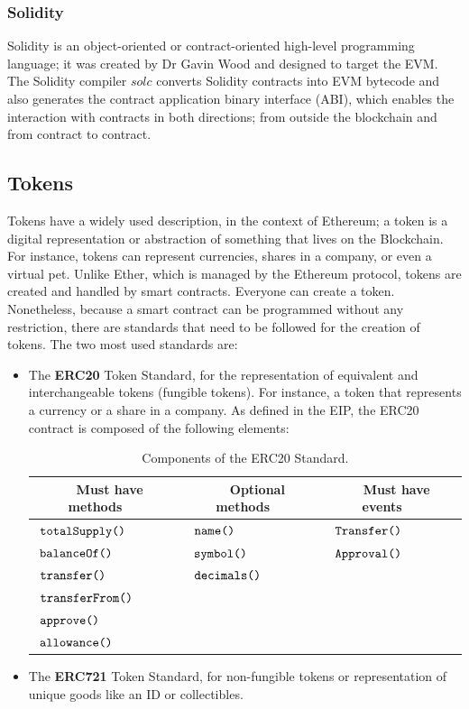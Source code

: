 \documentclass[11pt,a4paper]{report}
\begin{document}
\subsubsection{Solidity}
{Solidity}\cite{book:masteringETH-sc-solidity}\cite{solidity} is an object-oriented or contract-oriented high-level programming language; it was created by Dr Gavin Wood\cite{gavinwood} and designed to target the EVM.  The Solidity compiler $solc$ converts Solidity contracts into EVM bytecode and also generates the contract application binary interface (ABI)\cite{abi}, which enables the interaction with contracts in both directions; from outside the blockchain and from contract to contract.
 
\subsection{Tokens}\label{sec:tokens}
Tokens have a widely used description\cite{wiki:Token}, in the context of Ethereum; a token\cite{tokens} is a digital representation or abstraction of something that lives on the Blockchain. For instance, tokens can represent currencies, shares in a company, or even a virtual pet. Unlike Ether, which is managed by the Ethereum protocol, tokens are created and handled by smart contracts. Everyone can create a token. Nonetheless, because a smart contract can be programmed without any restriction, there are standards that need to be followed for the creation of tokens. The two most used standards are:
\begin{itemize}
	\item The \textbf{ERC20} Token Standard\cite{erc20}, for the representation of equivalent and interchangeable tokens (fungible tokens). For instance, a token that represents a currency or a share in a company. As defined in the EIP\cite{erc20}, the ERC20 contract is composed of the following elements:
	\begin{table}[htp]
		\centering
		\begin{tabular}{|l|l|l|}
			\hline
			\multicolumn{1}{|c|}{\textbf{~Must have methods~~~}} & 
			\multicolumn{1}{|c|}{\textbf{~Optional methods~~~}}  &
			\multicolumn{1}{|c|}{\textbf{~Must have events~~~}} \\\hline
			$~\verb|totalSupply()|$& $~\verb|name()|$  & $~\verb|Transfer()|$  \\
			$~\verb|balanceOf()|$& $~\verb|symbol()|$ & $~\verb|Approval()|$  \\
			$~\verb|transfer()|$& $~\verb|decimals()|$  &  \\
			$~\verb|transferFrom()|$&  &   \\
			$~\verb|approve()|$&  &   \\
			$~\verb|allowance()|$&  &   \\\hline		 
		\end{tabular}
		\caption{Components of the ERC20 Standard.}
		\label{tab:erc20}
	\end{table}
	\item The \textbf{ERC721} Token Standard\cite{erc721}, for non-fungible tokens or representation of unique goods like an ID or collectibles.
\end{itemize}
\end{document}
